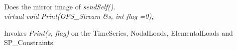 \\
Does the mirror image of {\em sendSelf()}. \\

{\em  virtual void Print(OPS_Stream \&s, int flag =0);}

Invokes {\em Print(s, flag)} on the TimeSeries, NodalLoads,
ElementalLoads and SP\_Constraints. 
